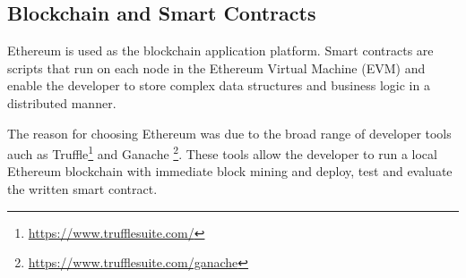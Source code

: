 \subsection{Blockchain and Smart Contracts}
Ethereum is used as the blockchain application platform. Smart contracts are scripts that run on each node in the Ethereum Virtual Machine (EVM) and enable the developer to store complex data structures and business logic in a distributed manner. 

The reason for choosing Ethereum was due to the broad range of developer tools auch as Truffle\footnote{\url{https://www.trufflesuite.com/}} and Ganache \footnote{\url{https://www.trufflesuite.com/ganache}}. These tools allow the developer to run a local Ethereum blockchain with immediate block mining and deploy, test and evaluate the written smart contract. 




